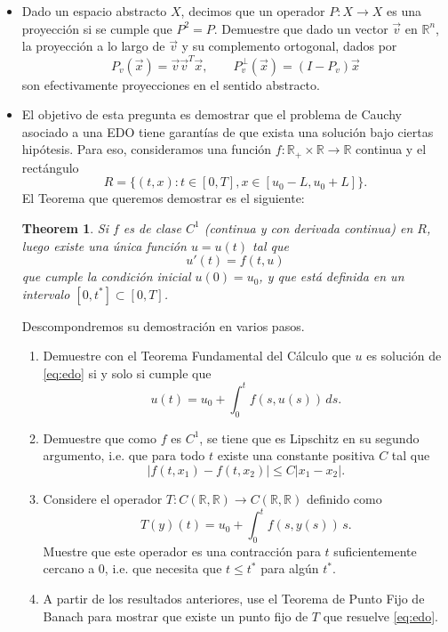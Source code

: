 \documentclass[9pt]{article}
\newcommand{\R}{\mathbb{R}}
\newcommand{\pts}[1]{[{\bf #1 puntos}] }
\newtheorem{theorem}{Theorem}
\begin{document}
\begin{itemize}
    \item\pts{2} Dado un espacio abstracto $X$, decimos que un operador $P:X\to X$ es una proyección si se cumple que $P^2 = P$. Demuestre que dado un vector $\vec v$ en $\R^n$, la proyección a lo largo de $\vec v$ y su complemento ortogonal, dados por
            $$ P_v(\vec x) = \vec v\vec v^T \vec x, \qquad P_v^\perp(\vec x) = (I - P_v)\vec x$$
            son efectivamente proyecciones en el sentido abstracto. 

    \item El objetivo de esta pregunta es demostrar que el problema de Cauchy asociado a una EDO tiene garantías de que exista una solución bajo ciertas hipótesis. Para eso, consideramos una función $f:\R_+ \times \R \to \R$ continua y el rectángulo
        $$ R = \{(t,x): t \in [0,T], x \in [u_0-L, u_0+L] \}. $$
        El Teorema que queremos demostrar es el siguiente: 
        \begin{theorem}
            Si $f$ es de clase $C^1$ (continua y con derivada continua) en $R$, luego existe una única función $u=u(t)$ tal que 
            \begin{equation}\label{eq:edo}
                u'(t) = f(t, u) 
            \end{equation}
            que cumple la condición inicial $u(0)=u_0$, y que está definida en un intervalo $[0,t^*]\subset [0,T]$. 
        \end{theorem}
        Descompondremos su demostración en varios pasos. 
        \begin{enumerate}
            \item\pts{1} Demuestre con el Teorema Fundamental del Cálculo que $u$ es solución de \eqref{eq:edo} si y solo si cumple que
                $$ u(t) = u_0 + \int_0^t f(s, u(s))\,ds. $$
            \item\pts{1} Demuestre que como $f$ es $C^1$, se tiene que es Lipschitz en su segundo argumento, i.e. que para todo $t$ existe una constante positiva $C$ tal que 
                    $$ |f(t, x_1) - f(t, x_2)|\leq C |x_1 - x_2|. $$
            \item\pts{3} Considere el operador $T:C(\R,\R)\to C(\R,\R)$ definido como
                        $$ T(y)(t) = u_0 + \int_0^t f(s, y(s))\,s. $$
                    Muestre que este operador es una contracción para $t$ suficientemente cercano a $0$, i.e. que necesita que $t\leq t^*$ para algún $t^*$. 
            \item\pts{2} A partir de los resultados anteriores, use el Teorema de Punto Fijo de Banach para mostrar que existe un punto fijo de $T$ que resuelve \eqref{eq:edo}. 

\end{enumerate}
\end{itemize}
\end{document}
